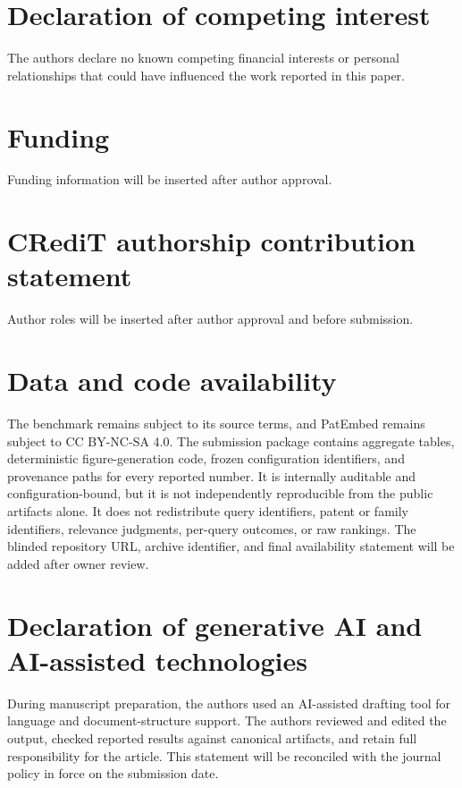 \documentclass[final,5p,times,twocolumn]{elsarticle}
\begin{document}
\section*{Declaration of competing interest}

The authors declare no known competing financial interests or personal
relationships that could have influenced the work reported in this paper.

\section*{Funding}

Funding information will be inserted after author approval.

\section*{CRediT authorship contribution statement}

Author roles will be inserted after author approval and before submission.

\section*{Data and code availability}

The benchmark remains subject to its source terms, and PatEmbed remains subject
to CC BY-NC-SA 4.0. The submission package contains aggregate tables,
deterministic figure-generation code, frozen configuration identifiers, and
provenance paths for every reported number. It is internally auditable and
configuration-bound, but it is not independently reproducible from the public
artifacts alone. It does not redistribute query
identifiers, patent or family identifiers, relevance judgments, per-query
outcomes, or raw rankings. The blinded repository URL, archive identifier,
and final availability statement will be added after owner review.

\section*{Declaration of generative AI and AI-assisted technologies}

During manuscript preparation, the authors used an AI-assisted drafting tool
for language and document-structure support. The authors reviewed and edited
the output, checked reported results against canonical artifacts, and retain
full responsibility for the article. This statement will be reconciled with
the journal policy in force on the submission date.
\end{document}
